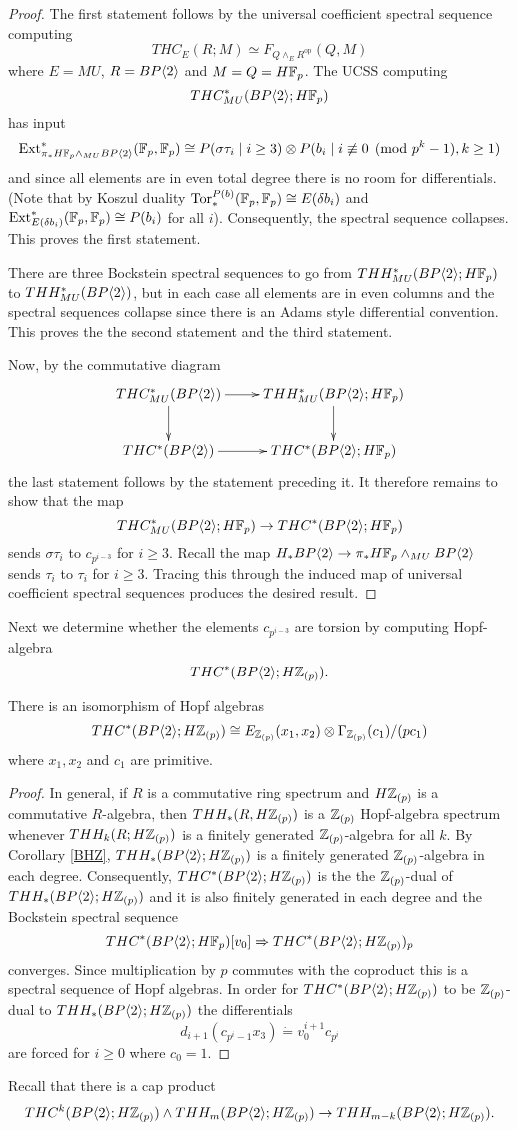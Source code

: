 \begin{proof}
The first statement follows by the universal coefficient spectral sequence computing 
\[ THC_E(R;M)\simeq F_{Q\wedge_E R^{\text{op}}} (Q,M) \]
where $E=MU$, $R=BP\langle 2 \rangle$ and $M=Q=H\mathbb{F}_p$. The UCSS computing 
\[THC_{MU}^*(BP\langle 2 \rangle;H\mathbb{F}_p)\] 
has input 
\[ \operatorname{Ext}_{\pi_*H\mathbb{F}_p\wedge_{MU}BP\langle 2 \rangle }^* (\mathbb{F}_p, \mathbb{F}_p)\cong P(\sigma  \tau_i \mid i\ge 3 )\otimes P(b_i \mid i\not \equiv 0 \pmod{p^k-1}, k\ge 1) \]
and since all elements are in even total degree there is no room for differentials. (Note that by Koszul duality $\operatorname{Tor}_*^{P(b)}(\mathbb{F}_p,\mathbb{F}_p)\cong E(\delta b_i)$ and $\operatorname{Ext}^*_{E(\delta b_i)}(\mathbb{F}_p,\mathbb{F}_p)\cong P(b_i)$ for all $i$). Consequently, the spectral sequence  collapses. This proves the first statement. 

There are three Bockstein spectral sequences to go from $THH_{MU}^*(BP\langle 2 \rangle;H\mathbb{F}_p)$ to $THH_{MU}^*(BP\langle 2 \rangle)$, but in each case all elements are in even columns and the spectral sequences collapse since there is an Adams style differential convention. This proves the the second statement and the third statement. 

Now, by the commutative diagram
\[
\xymatrix{
THC^*_{MU}(\B) \ar[r] \ar[d]& THH^*_{MU}(\B; H\F_p) \ar[d]  \\
THC^*(\B) \ar[r] & THC^*(\B; H\F_p) }
\]
the last statement follows by the statement preceding it. It therefore remains to show that the map 
\[ THC_{MU}^*(BP\langle 2 \rangle;H\mathbb{F}_p) \to THC^*(BP\langle 2 \rangle;H\mathbb{F}_p) \]
sends $\sigma \tau_i$ to $c_{p^{i-3}}$ for $i\ge 3$. Recall the map  $H_*BP\langle 2 \rangle\to \pi_*H\mathbb{F}_p\wedge_{MU}BP\langle 2 \rangle$ sends $\tau_i$ to $\tau_i$ for $i\ge  3$. Tracing this through the induced map of universal coefficient spectral sequences produces the desired result. 
\end{proof}

Next we determine whether the elements $c_{p^{i-3}}$ are torsion by computing Hopf-algebra
\[THC^*(BP\langle 2 \rangle;H\mathbb{Z}_{(p)}).\] 
\begin{lem}
There is an isomorphism of Hopf algebras 
\[ THC^*(BP\langle 2 \rangle;H\mathbb{Z}_{(p)})\cong E_{\mathbb{Z}_{(p)}}(x_1,x_2)\otimes \Gamma_{\mathbb{Z}_{(p)}}(c_1)/(pc_1)\]
where $x_1,x_2$ and $c_1$ are primitive. 
\end{lem}
\begin{proof}
In general, if $R$ is a commutative ring spectrum and $H\mathbb{Z}_{(p)}$ is a commutative $R$-algebra, then $THH_*(R,H\mathbb{Z}_{(p)})$ is a $\mathbb{Z}_{(p)}$ Hopf-algebra spectrum whenever $THH_k(R;H\mathbb{Z}_{(p)})$ is a finitely generated $\mathbb{Z}_{(p)}$-algebra for all $k$. By Corollary \ref{BHZ}, $THH_*(BP\langle 2 \rangle;H\mathbb{Z}_{(p)})$ is a finitely generated $\mathbb{Z}_{(p)}$-algebra in each degree. Consequently, $THC^*(BP\langle 2 \rangle;H\mathbb{Z}_{(p)})$ is the the $\mathbb{Z}_{(p)}$-dual of $THH_*(BP\langle 2 \rangle;H\mathbb{Z}_{(p)})$ and it is also finitely generated in each degree and the Bockstein spectral sequence 
\[ THC^*(BP\langle 2 \rangle;H\mathbb{F}_p)[v_0]\Rightarrow THC^*(BP\langle 2 \rangle;H\mathbb{Z}_{(p)})_p\]
converges. Since multiplication by $p$ commutes with the coproduct this is a spectral sequence of Hopf algebras. In order for $THC^*(BP\langle 2 \rangle;H\mathbb{Z}_{(p)})$ to be $\mathbb{Z}_{(p)}$-dual to $THH_*(BP\langle 2 \rangle;H\mathbb{Z}_{(p)})$ the differentials
\[ d_{i+1}(c_{p^{i}-1}x_3) \dot{=} v_0^{i+1}c_{p^i}\]
are forced for $i\ge 0$ where $c_0=1$.
\end{proof}
Recall that there is a cap product 
\[ THC^k(BP\langle 2 \rangle;H\mathbb{Z}_{(p)})\wedge THH_m(BP\langle 2 \rangle;H\mathbb{Z}_{(p)})\rightarrow THH_{m-k}(BP\langle 2 \rangle;H\mathbb{Z}_{(p)}).\]

